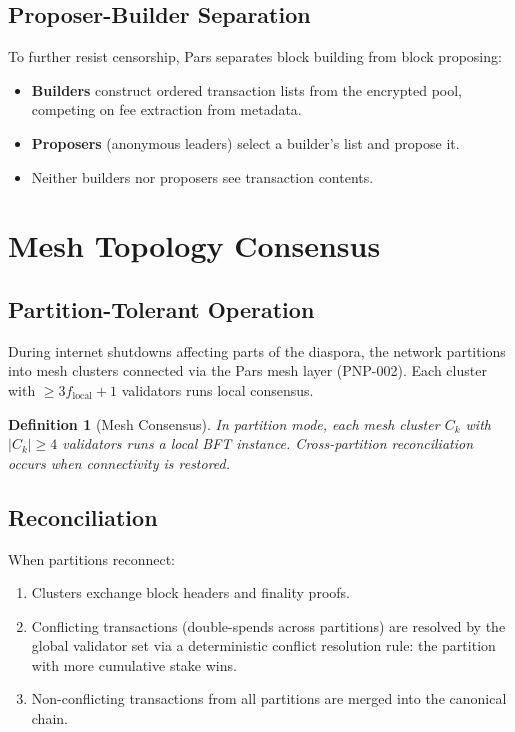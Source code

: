\documentclass[11pt,a4paper]{article}
\newtheorem{definition}{Definition}[section]
\begin{document}
\subsection{Proposer-Builder Separation}

To further resist censorship, Pars separates block building from block
proposing:

\begin{itemize}
    \item \textbf{Builders} construct ordered transaction lists from the
    encrypted pool, competing on fee extraction from metadata.
    \item \textbf{Proposers} (anonymous leaders) select a builder's
    list and propose it.
    \item Neither builders nor proposers see transaction contents.
\end{itemize}

\section{Mesh Topology Consensus}
\label{sec:mesh}

\subsection{Partition-Tolerant Operation}

During internet shutdowns affecting parts of the diaspora, the network
partitions into mesh clusters connected via the Pars mesh layer
(PNP-002).  Each cluster with $\geq 3f_{\mathrm{local}} + 1$ validators
runs local consensus.

\begin{definition}[Mesh Consensus]
    In partition mode, each mesh cluster $C_k$ with $|C_k| \geq 4$
    validators runs a local BFT instance.  Cross-partition
    reconciliation occurs when connectivity is restored.
\end{definition}

\subsection{Reconciliation}

When partitions reconnect:

\begin{enumerate}
    \item Clusters exchange block headers and finality proofs.
    \item Conflicting transactions (double-spends across partitions) are
    resolved by the global validator set via a deterministic conflict
    resolution rule: the partition with more cumulative stake wins.
    \item Non-conflicting transactions from all partitions are merged
    into the canonical chain.
\end{enumerate}
\end{document}
